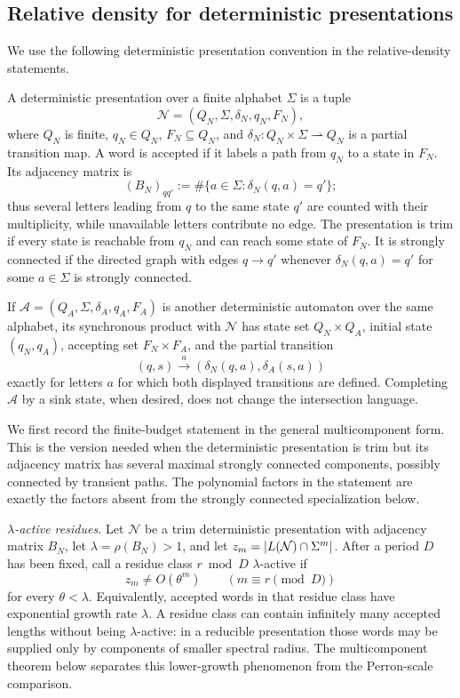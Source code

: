 \subsection{Relative density for deterministic presentations}

We use the following deterministic presentation convention in the
relative-density statements.

\begin{definition}
  \label{def:trim-deterministic-presentation}
  A deterministic presentation over a finite alphabet \(\Sigma\) is a
  tuple
  \[
    \mathcal N=(Q_N,\Sigma,\delta_N,q_N,F_N),
  \]
  where \(Q_N\) is finite, \(q_N\in Q_N\), \(F_N\subseteq Q_N\), and
  \(\delta_N:Q_N\times\Sigma\rightharpoonup Q_N\) is a partial
  transition map. A word is accepted if it labels a path from \(q_N\)
  to a state in \(F_N\). Its adjacency matrix is
  \[
    (B_N)_{qq'}
    :=\#\{a\in\Sigma:\delta_N(q,a)=q'\};
  \]
  thus several letters leading from \(q\) to the same state \(q'\) are
  counted with their multiplicity, while unavailable letters contribute
  no edge. The presentation is trim if every state is reachable from
  \(q_N\) and can reach some state of \(F_N\). It is strongly connected
  if the directed graph with edges \(q\to q'\) whenever
  \(\delta_N(q,a)=q'\) for some \(a\in\Sigma\) is strongly connected.

  If \(\mathcal A=(Q_A,\Sigma,\delta_A,q_A,F_A)\) is another
  deterministic automaton over the same alphabet, its synchronous
  product with \(\mathcal N\) has state set \(Q_N\times Q_A\), initial
  state \((q_N,q_A)\), accepting set \(F_N\times F_A\), and the partial
  transition
  \[
    (q,s)\xrightarrow{a}(\delta_N(q,a),\delta_A(s,a))
  \]
  exactly for letters \(a\) for which both displayed transitions are
  defined. Completing \(\mathcal A\) by a sink state, when desired, does
  not change the intersection language.
\end{definition}

We first record the finite-budget statement in the general
multicomponent form. This is the version needed when the deterministic
presentation is trim but its adjacency matrix has several maximal
strongly connected components, possibly connected by transient paths.
The polynomial factors in the statement are exactly the factors absent
from the strongly connected specialization below.

\noindent\textit{\(\lambda\)-active residues.}
Let \(\mathcal N\) be a trim deterministic presentation with adjacency
matrix \(B_N\), let \(\lambda=\rho(B_N)>1\), and let
\(z_m=\lvert L(\mathcal N)\cap\Sigma^m \rvert\). After a period \(D\) has been
fixed, call a residue class \(r\bmod D\) \(\lambda\)-active if
\[
  z_m\not=O(\theta^m)
  \qquad (m\equiv r\pmod D)
\]
for every \(\theta<\lambda\). Equivalently, accepted words in that
residue class have exponential growth rate \(\lambda\). A residue class
can contain infinitely many accepted lengths without being
\(\lambda\)-active: in a reducible presentation those words may be
supplied only by components of smaller spectral radius. The
multicomponent theorem below separates this lower-growth phenomenon
from the Perron-scale comparison.

